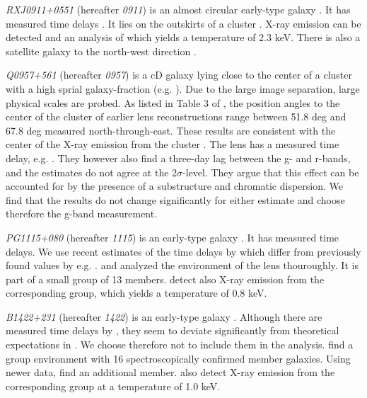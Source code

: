\documentclass[useAMS,usenatbib]{mn2e}
\begin{document}
\textit{RXJ0911+0551} (hereafter \textit{0911}) is an almost circular early-type galaxy \citep{2012A&A...538A..99S}. It has measured time delays \citep{2002ApJ...572L..11H}. It lies on the outskirts of a cluster \citep{2001ApJ...555....1M}. X-ray emission can be detected and an analysis of which yields a temperature of 2.3 keV. There is also a satellite galaxy to the north-west direction \citep{2000ApJ...544L..35K}. %

\textit{Q0957+561} (hereafter \textit{0957}) is a cD galaxy lying close to the center of a cluster with a high sprial galaxy-fraction (e.g. \cite{1992MNRAS.254P..27G,1994A&A...291..411A,1998ApJ...504..661C}). Due to the large image separation, large physical scales are probed. As listed in Table 3 of \cite{2000ApJ...542...74K}, the position angles to the center of the cluster of earlier lens reconstructions range between 51.8 deg and 67.8 deg measured north-through-east. These results are consistent with the center of the X-ray emission from the cluster \citep{1998ApJ...504..661C}. The lens has a measured time delay, e.g. \citep{2012A&A...540A.132S}. They however also find a three-day lag between the g- and r-bands, and the estimates do not agree at the 2$\sigma$-level. They argue that this effect can be accounted for by the presence of a substructure and chromatic dispersion. We find that the results do not change significantly for either estimate and choose therefore the g-band measurement.

\textit{PG1115+080} (hereafter \textit{1115}) is an early-type galaxy \citep{2005ApJ...626...51Y}. It has measured time delays. We use recent estimates of the time delays by \cite{2010MNRAS.406.2764T} which differ from previously found values by e.g. \cite{1997ApJ...489...21B}. \cite{2006ApJ...641..169M} and \cite{2011ApJ...726...84W} analyzed the environment of the lens thouroughly. It is part of a small group of 13 members. \cite{2004ApJ...610..686G} detect also X-ray emission from the corresponding group, which yields a temperature of 0.8 keV.

\textit{B1422+231} (hereafter \textit{1422}) is an early-type galaxy \citep{1996ApJ...462L..53I}. Although there are measured time delays by \cite{2001MNRAS.326.1403P}, they seem to deviate significantly from theoretical expectations in \cite{2003AJ....126...29R}. We choose therefore not to include them in the analysis. \cite{2006ApJ...641..169M} find a group environment with 16 spectroscopically confirmed member galaxies. Using newer data, \cite{2011ApJ...726...84W} find an additional member. \cite{2004ApJ...610..686G} also detect X-ray emission from the corresponding group at a temperature of 1.0 keV.
\end{document}
